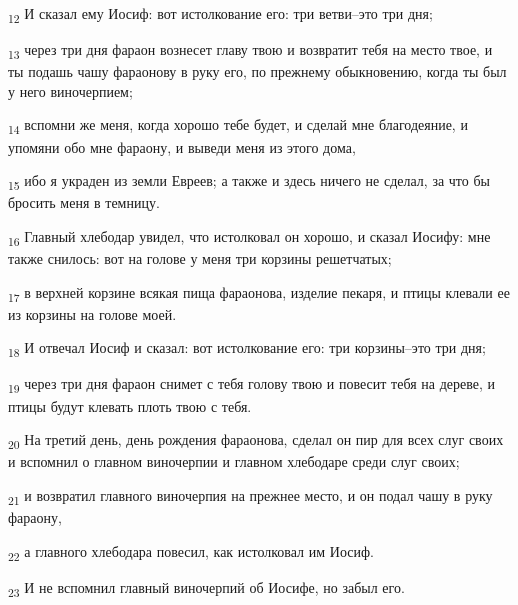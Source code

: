 \begin{tcolorbox}
\textsubscript{12} И сказал ему Иосиф: вот истолкование его: три ветви--это три дня;
\end{tcolorbox}
\begin{tcolorbox}
\textsubscript{13} через три дня фараон вознесет главу твою и возвратит тебя на место твое, и ты подашь чашу фараонову в руку его, по прежнему обыкновению, когда ты был у него виночерпием;
\end{tcolorbox}
\begin{tcolorbox}
\textsubscript{14} вспомни же меня, когда хорошо тебе будет, и сделай мне благодеяние, и упомяни обо мне фараону, и выведи меня из этого дома,
\end{tcolorbox}
\begin{tcolorbox}
\textsubscript{15} ибо я украден из земли Евреев; а также и здесь ничего не сделал, за что бы бросить меня в темницу.
\end{tcolorbox}
\begin{tcolorbox}
\textsubscript{16} Главный хлебодар увидел, что истолковал он хорошо, и сказал Иосифу: мне также снилось: вот на голове у меня три корзины решетчатых;
\end{tcolorbox}
\begin{tcolorbox}
\textsubscript{17} в верхней корзине всякая пища фараонова, изделие пекаря, и птицы клевали ее из корзины на голове моей.
\end{tcolorbox}
\begin{tcolorbox}
\textsubscript{18} И отвечал Иосиф и сказал: вот истолкование его: три корзины--это три дня;
\end{tcolorbox}
\begin{tcolorbox}
\textsubscript{19} через три дня фараон снимет с тебя голову твою и повесит тебя на дереве, и птицы будут клевать плоть твою с тебя.
\end{tcolorbox}
\begin{tcolorbox}
\textsubscript{20} На третий день, день рождения фараонова, сделал он пир для всех слуг своих и вспомнил о главном виночерпии и главном хлебодаре среди слуг своих;
\end{tcolorbox}
\begin{tcolorbox}
\textsubscript{21} и возвратил главного виночерпия на прежнее место, и он подал чашу в руку фараону,
\end{tcolorbox}
\begin{tcolorbox}
\textsubscript{22} а главного хлебодара повесил, как истолковал им Иосиф.
\end{tcolorbox}
\begin{tcolorbox}
\textsubscript{23} И не вспомнил главный виночерпий об Иосифе, но забыл его.
\end{tcolorbox}
